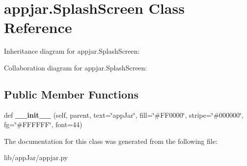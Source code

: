 \hypertarget{classappjar_1_1_splash_screen}{}\section{appjar.\+Splash\+Screen Class Reference}
\label{classappjar_1_1_splash_screen}


Inheritance diagram for appjar.\+Splash\+Screen\+:


Collaboration diagram for appjar.\+Splash\+Screen\+:
\subsection*{Public Member Functions}
\begin{DoxyCompactItemize}
\item 
\mbox{\label{classappjar_1_1_splash_screen_aab00fe16b656db833208db52c21f8973}} 
def {\bfseries \+\_\+\+\_\+init\+\_\+\+\_\+} (self, parent, text=\char`\"{}app\+Jar\char`\"{}, fill=\char`\"{}\#F\+F0000\char`\"{}, stripe=\char`\"{}\#000000\char`\"{}, fg=\char`\"{}\#F\+F\+F\+F\+FF\char`\"{}, font=44)
\end{DoxyCompactItemize}


The documentation for this class was generated from the following file\+:\begin{DoxyCompactItemize}
\item 
lib/app\+Jar/appjar.\+py\end{DoxyCompactItemize}
